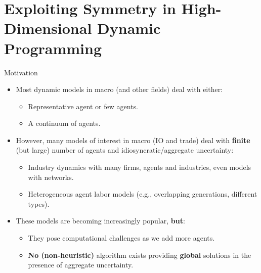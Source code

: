 \documentclass[aspectratio=169,10pt]{beamer}
\newcommand{\emphcolor}[1]{\textbf{\textcolor{emphcolorval}{#1}}}
\begin{document}
\section{\textcolor{PennBlue}{Exploiting Symmetry in High-Dimensional Dynamic Programming}}

\begin{frame}{Motivation}
	\begin{itemize}
		\item Most dynamic models in macro (and other fields) deal with either:\vspace{0.1in}
		\begin{itemize}
		\item Representative agent or few agents.\vspace{0.1in}
		\item A continuum of agents.\vspace{0.1in}
		\end{itemize} 
	\item However, many models of interest in macro (IO and trade) deal with \emphcolor{finite} (but large) number of agents and idiosyncratic/aggregate uncertainty:\vspace{0.1in}
		\begin{itemize}
		\item Industry dynamics with many firms, agents and industries,  even models with networks.\vspace{0.1in}
		\item Heterogeneous agent labor models (e.g., overlapping generations, different types).\vspace{0.1in}
		
	\end{itemize}
	\item These models are becoming increasingly popular, \emphcolor{but}:\vspace{0.1in}
		\begin{itemize}
			\item They pose computational challenges as we add more agents.\vspace{0.1in}
			\item \emphcolor{No (non-heuristic)} algorithm exists providing \emphcolor{global} solutions in the presence of aggregate uncertainty.  
		\end{itemize}	
	\end{itemize}	
			  
\end{frame}
\end{document}
